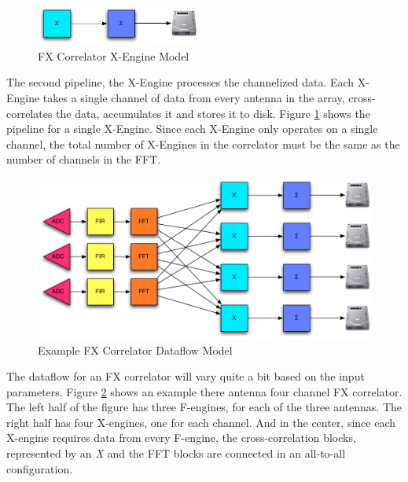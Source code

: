 \begin{figure}[h!]
  \centering
    \includegraphics[width=0.48\textwidth]{Images/C4/fx_x_engine.pdf}
  \caption{FX Correlator X-Engine Model}
  \label{fig: C4/fx_x_engine.pdf}
\end{figure}

The second pipeline, the X-Engine processes the channelized data. 
Each X-Engine takes a single channel of data from every antenna in the array, cross-correlates the data, accumulates it and stores it to disk. 
Figure \ref{fig: C4/fx_x_engine.pdf} shows the pipeline for a single X-Engine. 
Since each X-Engine only operates on a single channel, the total number of X-Engines in the correlator must be the same as the number of channels in the FFT.

\begin{figure}[h!]
  \centering
    \includegraphics[width=1\textwidth]{Images/C4/fx_dataflow.pdf}
  \caption{Example FX Correlator Dataflow Model}
  \label{fig: C4/fx_dataflow.pdf}
\end{figure}

The dataflow for an FX correlator will vary quite a bit based on the input parameters. 
Figure \ref{fig: C4/fx_dataflow.pdf} shows an example there antenna four channel FX correlator. 
The left half of the figure has three F-engines, for each of the three antennas.
The right half has four X-engines, one for each channel.
And in the center, since each X-engine requires data from every F-engine, the cross-correlation blocks, represented by an \emph{X} and the FFT blocks are connected in an all-to-all configuration.



